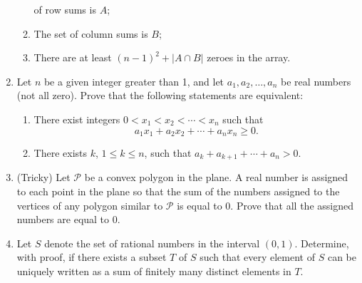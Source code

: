 \documentclass[12pt]{article}
\begin{document}
\begin{enumerate}
\begin{enumerate}
    of row sums is $A$; \item The set of column sums is $B$; \item
    There are at least $(n-1)^2+|A\cap B|$ zeroes in the array. \end{enumerate}
\item Let $n$ be a given integer greater than 1, and let
  $a_1,a_2,\ldots,a_n$ be real numbers (not all zero).  Prove that the
  following statements are equivalent:
\begin{enumerate}
\item There exist integers $0<x_1<x_2<\cdots<x_n$ such
  that \[a_1x_1+a_2x_2+\cdots +a_nx_n\geq 0.\] \item There exists $k$,
  $1\leq k\leq n$, such that $a_k+a_{k+1}+\cdots+a_n>0.$
\end{enumerate}
\item (Tricky) Let $\mathcal P$ be a convex polygon in the plane.  A
  real number is assigned to each point in the plane so that the sum
  of the numbers assigned to the vertices of any polygon similar to
  $\mathcal P$ is equal to 0.  Prove that all the assigned numbers are
  equal to 0.
\item Let $S$ denote the set of rational numbers in the interval
  $(0,1)$.  Determine, with proof, if there exists a subset $T$ of $S$
  such that every element of $S$ can be uniquely written as a sum of
  finitely many distinct elements in $T$.
\end{enumerate}
\end{document}
